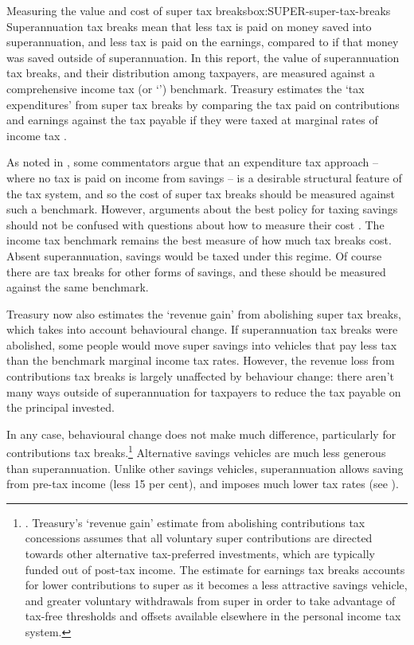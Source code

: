 \begin{smallbox}[tp]{Measuring the value and cost of super tax breaks}{box:SUPER-super-tax-breaks}
Superannuation tax breaks mean that less tax is paid on money saved into superannuation, and less tax is paid on the earnings, compared to if that money was saved outside of superannuation. In this report, the value of superannuation tax breaks, and their distribution among taxpayers, are measured against a comprehensive income tax (or ‘\TTE’) benchmark. Treasury estimates the ‘tax expenditures’ from super tax breaks by comparing the tax paid on contributions and earnings against the tax payable if they were taxed at marginal rates of income tax \textcite{Treasury2015TES2014}. 

As noted in , some commentators argue that an expenditure tax approach – where no tax is paid on income from savings – is a desirable structural feature of the tax system, and so the cost of super tax breaks should be measured against such a benchmark. However, arguments about the best policy for taxing savings should not be confused with questions about how to measure their cost \textcite{DaleyWoodCoates2015}. The income tax benchmark remains the best measure of how much tax breaks cost. Absent superannuation, savings would be taxed under this regime. Of course there are tax breaks for other forms of savings, and these should be measured against the same benchmark. 

Treasury now also estimates the ‘revenue gain’ from abolishing super tax breaks, which takes into account behavioural change. If superannuation tax breaks were abolished, some people would move super savings into vehicles that pay less tax than the benchmark marginal income tax rates. However, the revenue loss from contributions tax breaks is largely unaffected by behaviour change: there aren’t many ways outside of superannuation for taxpayers to reduce the tax payable on the principal invested. 
\end{smallbox}

In any case, behavioural change does not make much difference, particularly for contributions tax breaks.\footnote{\textcite[][124]{Treasury2015TES2014}. Treasury’s ‘revenue gain’ estimate from abolishing contributions tax concessions assumes that all voluntary super contributions are directed towards other alternative tax-preferred investments, which are typically funded out of post-tax income. The estimate for earnings tax breaks accounts for lower contributions to super as it becomes a less attractive savings vehicle, and greater voluntary withdrawals from super in order to take advantage of tax-free thresholds and offsets available elsewhere in the personal income tax system.}  
Alternative savings vehicles are much less generous than superannuation. Unlike other savings vehicles, superannuation allows saving from pre-tax income (less 15 per cent), and imposes much lower tax rates (see ). 

